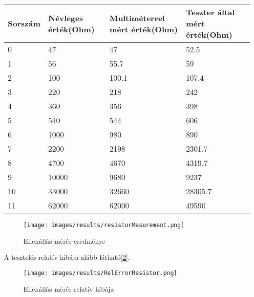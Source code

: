 \begin{table}[H]
    \begin{tabular}{|l|l|l|l|}
    \hline
    Sorszám & Névleges érték(Ohm) & Multiméterrel mért érték(Ohm) & Teszter által mért érték(Ohm) \\ \hline
    0       & 47             & 47                       & 52.5                     \\ \hline
    1       & 56             & 55.7                     & 59                       \\ \hline
    2       & 100            & 100.1                    & 107.4                    \\ \hline
    3       & 220            & 218                      & 242                      \\ \hline
    4       & 360            & 356                      & 398                      \\ \hline
    5       & 540            & 544                      & 606                      \\ \hline
    6       & 1000           & 980                      & 890                      \\ \hline
    7       & 2200           & 2198                     & 2301.7                   \\ \hline
    8       & 4700           & 4670                     & 4319.7                   \\ \hline
    9       & 10000          & 9680                     & 9237                     \\ \hline
    10      & 33000          & 32660                    & 28305.7                  \\ \hline
    11      & 62000          & 62000                    & 49590                    \\ \hline
    \end{tabular}
    \end{table}

    \begin{figure}[H]
        \centering
        \texttt{[image: images/results/resistorMesurement.png]}
        \caption{Ellenállás mérés eredménye}
        \label{fig:ResistorResults}
    \end{figure}

    A tesztelés relatív hibája alább látható[\ref{fig:ResistorRelErrorResults}].
    \begin{figure}[H]
        \centering
        \texttt{[image: images/results/RelErrorResistor.png]}
        \caption{Ellenállás mérés relatív hibája}
        \label{fig:ResistorRelErrorResults}
    \end{figure}


